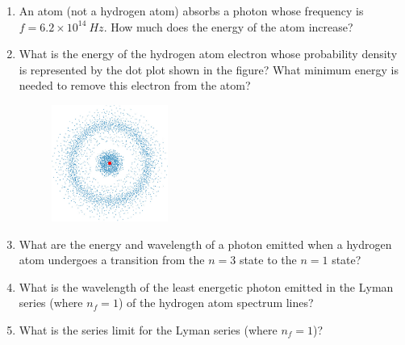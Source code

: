 \begin{enumerate}

\item An atom (not a hydrogen atom) absorbs a photon whose frequency is
$f = 6.2\times 10^{14}~Hz$.
How much does the energy of the atom increase?

\item What is the energy of the hydrogen atom  electron whose probability density
is represented by the dot plot shown in the figure? 
What minimum energy is needed to remove this electron from the atom?
\begin{figure}[hbt]
\begin{center}
\includegraphics[height=1.5in]{solveSE/hwfig2.eps}
\end{center}
\end{figure}

\item What are the energy and wavelength of a photon emitted when a hydrogen atom
undergoes a transition from the $n=3$ state to the $n=1$ state?

\item What is the wavelength of the least energetic photon emitted in the Lyman
series (where $n_f = 1$) of the hydrogen atom spectrum lines?

\item What is the series limit for the Lyman series (where $n_f = 1$)?

\end{enumerate}
